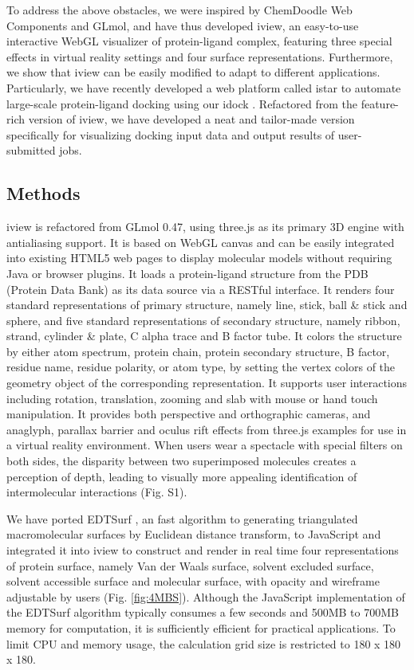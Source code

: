 \documentclass{bioinfo}
\begin{document}
To address the above obstacles, we were inspired by ChemDoodle Web Components and GLmol, and have thus developed iview, an easy-to-use interactive WebGL visualizer of protein-ligand complex, featuring three special effects in virtual reality settings and four surface representations. Furthermore, we show that iview can be easily modified to adapt to different applications. Particularly, we have recently developed a web platform called istar to automate large-scale protein-ligand docking using our idock \citep{1153}. Refactored from the feature-rich version of iview, we have developed a neat and tailor-made version specifically for visualizing docking input data and output results of user-submitted jobs.

\begin{methods}
\section{Methods}

iview is refactored from GLmol 0.47, using three.js as its primary 3D engine with antialiasing support. It is based on WebGL canvas and can be easily integrated into existing HTML5 web pages to display molecular models without requiring Java or browser plugins. It loads a protein-ligand structure from the PDB (Protein Data Bank) \citep{539,537} as its data source via a RESTful interface. It renders four standard representations of primary structure, namely line, stick, ball \& stick and sphere, and five standard representations of secondary structure, namely ribbon, strand, cylinder \& plate, C alpha trace and B factor tube. It colors the structure by either atom spectrum, protein chain, protein secondary structure, B factor, residue name, residue polarity, or atom type, by setting the vertex colors of the geometry object of the corresponding representation. It supports user interactions including rotation, translation, zooming and slab with mouse or hand touch manipulation. It provides both perspective and orthographic cameras, and anaglyph, parallax barrier and oculus rift effects from three.js examples for use in a virtual reality environment. When users wear a spectacle with special filters on both sides, the disparity between two superimposed molecules creates a perception of depth, leading to visually more appealing identification of intermolecular interactions (Fig. S1).

We have ported EDTSurf \citep{1297,1350}, an fast algorithm to generating triangulated macromolecular surfaces by Euclidean distance transform, to JavaScript and integrated it into iview to construct and render in real time four representations of protein surface, namely Van der Waals surface, solvent excluded surface, solvent accessible surface and molecular surface, with opacity and wireframe adjustable by users (Fig. \ref{fig:4MBS}). Although the JavaScript implementation of the EDTSurf algorithm typically consumes a few seconds and 500MB to 700MB memory for computation, it is sufficiently efficient for practical applications. To limit CPU and memory usage, the calculation grid size is restricted to 180 x 180 x 180.


\end{methods}
\end{document}
